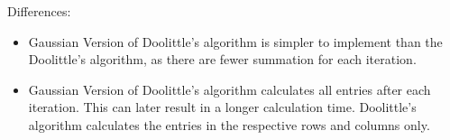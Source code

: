 \documentclass[a4paper,titlepage]{article}
\begin{document}
			Differences:
			\begin{itemize}
				\item Gaussian Version of Doolittle's algorithm is simpler to implement than the Doolittle's algorithm, as there are fewer summation for each iteration. 
				\item Gaussian Version of Doolittle's algorithm calculates all entries after each iteration. This can later result in a longer calculation time. Doolittle's algorithm calculates the entries in the respective rows and columns only. 
			\end{itemize}
\end{document}
